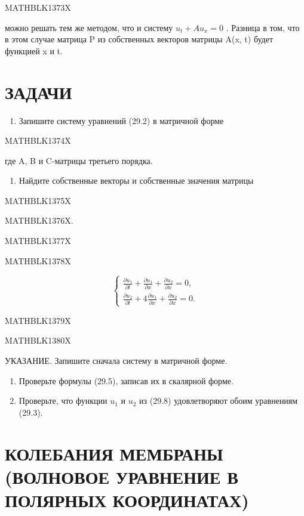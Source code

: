 \documentclass[
]{article}
\providecommand{\tightlist}{%
  \setlength{\itemsep}{0pt}\setlength{\parskip}{0pt}}
\begin{document}
MATHBLK1373X

можно решать тем же методом, что и систему \(u_t + Au_x = 0\) . Разница
в том, что в этом случае матрица P из собственных векторов матрицы A(x,
t) будет функцией x и t.

\section{ЗАДАЧИ}\label{ux437ux430ux434ux430ux447ux438-4}

\begin{enumerate}
\def\labelenumi{\arabic{enumi}.}
\tightlist
\item
  Запишите систему уравнений (29.2) в матричной форме
\end{enumerate}

MATHBLK1374X

где A, B и C-матрицы третьего порядка.

\begin{enumerate}
\def\labelenumi{\arabic{enumi}.}
\setcounter{enumi}{1}
\tightlist
\item
  Найдите собственные векторы и собственные значения матрицы
\end{enumerate}

MATHBLK1375X

MATHBLK1376X.

MATHBLK1377X

MATHBLK1378X

\[
\begin{cases} \frac{\partial u_1}{\partial t} + \frac{\partial u_1}{\partial x} + \frac{\partial u_2}{\partial x} = 0, \\ \frac{\partial u_2}{\partial t} + 4 \frac{\partial u_1}{\partial x} + \frac{\partial u_2}{\partial x} = 0. \end{cases}
\]

MATHBLK1379X

MATHBLK1380X

УКАЗАНИЕ. Запишите сначала систему в матричной форме.

\begin{enumerate}
\def\labelenumi{\arabic{enumi}.}
\setcounter{enumi}{3}
\item
  Проверьте формулы (29.5), записав их в скалярной форме.
\item
  Проверьте, что функции \(u_1\) и \(u_2\) из (29.8) удовлетворяют обоим
  уравнениям (29.3).
\end{enumerate}

\section{КОЛЕБАНИЯ МЕМБРАНЫ (ВОЛНОВОЕ УРАВНЕНИЕ В ПОЛЯРНЫХ
КООРДИНАТАХ)}\label{ux43aux43eux43bux435ux431ux430ux43dux438ux44f-ux43cux435ux43cux431ux440ux430ux43dux44b-ux432ux43eux43bux43dux43eux432ux43eux435-ux443ux440ux430ux432ux43dux435ux43dux438ux435-ux432-ux43fux43eux43bux44fux440ux43dux44bux445-ux43aux43eux43eux440ux434ux438ux43dux430ux442ux430ux445}
\end{document}
